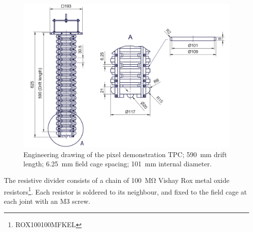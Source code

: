 \documentclass[instruments,article,submit,moreauthors,pdftex]{Definitions/mdpi}
\begin{document}
\begin{figure}[!ht]
	\centering
	\includegraphics[width=0.9\linewidth]{Figures/Schematic.png}
	\caption{\small Engineering drawing of the pixel demonstration TPC; \SI{590}{\milli\metre} drift length; \SI{6.25}{\milli\metre} field cage spacing; \SI{101}{\milli\metre} internal diameter.}
	\label{fig:schematic}
\end{figure}

The resistive divider consists of a chain of \SI{100}{\mega\ohm} Vishay Rox metal oxide resistors\footnote{ROX100100MFKEL}. Each resistor is soldered to its neighbour, and fixed to the field cage at each joint with an M3 screw.   
\end{document}
